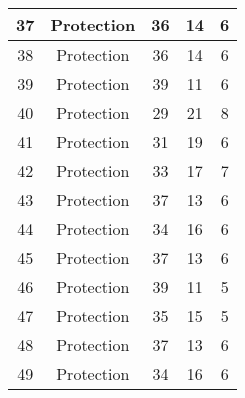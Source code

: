 \documentclass[results.tex]{subfiles}
\begin{document}
\begin{center}
\begin{tabular}{| c || c | c | c | c |}
            \hline
            37                      & Protection                   & 36                     & 14                      & 6                    \\
            \hline
            38                      & Protection                   & 36                     & 14                      & 6                    \\
            \hline
            39                      & Protection                   & 39                     & 11                      & 6                    \\
            \hline
            40                      & Protection                   & 29                     & 21                      & 8                    \\
            \hline
            41                      & Protection                   & 31                     & 19                      & 6                    \\
            \hline
            42                      & Protection                   & 33                     & 17                      & 7                    \\
            \hline
            43                      & Protection                   & 37                     & 13                      & 6                    \\
            \hline
            44                      & Protection                   & 34                     & 16                      & 6                    \\
            \hline
            45                      & Protection                   & 37                     & 13                      & 6                    \\
            \hline
            46                      & Protection                   & 39                     & 11                      & 5                    \\
            \hline
            47                      & Protection                   & 35                     & 15                      & 5                    \\
            \hline
            48                      & Protection                   & 37                     & 13                      & 6                    \\
            \hline
            49                      & Protection                   & 34                     & 16                      & 6                    \\
            \hline
        \end{tabular}
    \end{center}
\end{document}
